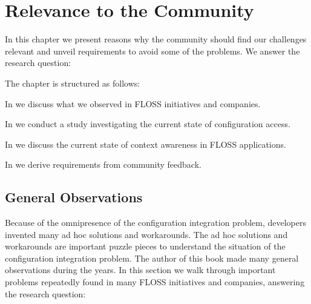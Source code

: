 \chapter{Relevance to the Community}
\label{chapter:motivation}

\chapterhung

In this chapter we present reasons why the community should find our challenges relevant and unveil requirements to avoid some of the problems.
We answer the research question:
\rqMotivation*

The chapter is structured as follows:

In  we discuss what we observed in FLOSS initiatives and companies.

In  we conduct a study investigating the current state of configuration access.

In  we discuss the current state of context awareness in FLOSS applications.

In  we derive requirements from community feedback.






























\section{General Observations}
\label{sec:observations}

Because of the omnipresence of the configuration integration problem, developers invented many ad hoc solutions and workarounds.
The ad hoc solutions and workarounds are important puzzle pieces to understand the situation of the configuration integration problem.
The author of this book made many general observations during the years.
In this section we walk through important problems repeatedly found in many FLOSS initiatives and companies, answering the research question:
\rqMotivationObservation*

